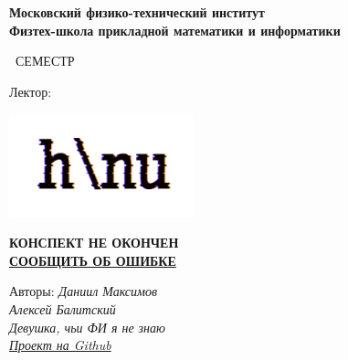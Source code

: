 \begin{titlepage}
	\clearpage\thispagestyle{empty}
	\centering
	
	\textbf{Московский физико-технический институт \\ Физтех-школа прикладной математики и информатики}
	\vspace{33ex}
	
	{\textbf{\FullCourseNameFirstPart}}
	
	\SemesterNumber\ СЕМЕСТР  
	\vspace{1ex}
	
	Лектор: \textit{\LecturerInitials}
	
	\includegraphics[width=0.4\textwidth]{images/logo_ltc.png}
	
	{\large \textbf{КОНСПЕКТ НЕ ОКОНЧЕН}
	\\
	\href{https://docs.google.com/forms/d/e/1FAIpQLSdlFj96AAxhwq3hM0PjiOZ6nvuIHpRIrEMqAPnATpLz4G3-NA/viewform?usp=sf_link}{\textbf{СООБЩИТЬ ОБ ОШИБКЕ}}}

	\begin{flushright}
		\noindent
		Авторы: \textit{Даниил Максимов}
		\\
		\textit{Алексей Балитский}
		\\
		\textit{Девушка, чьи ФИ я не знаю}
		\\
		\href{\GithubLink}{\textit{Проект на Github}}
	\end{flushright}
	
	\vfill
	\CourseDate
	\pagebreak
\end{titlepage}
